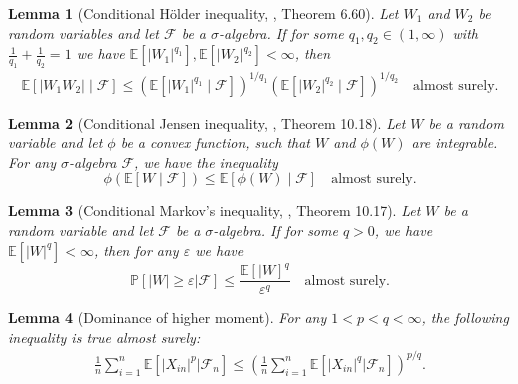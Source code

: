 \documentclass[12pt]{article}
\newtheorem{lemma}{Lemma}
\theoremstyle{definition}
\def\P{\mathbb{P}}
\def\P{\mathbb{P}}
\newcommand{\E}{\mathbb E}								%
\renewcommand{\P}{\mathbb{P}}							%
\begin{document}
\begin{lemma}[Conditional H\"older inequality, \cite{Swanson2019}, Theorem 6.60]\label{lem:cond_holder}
	Let $W_1$ and $W_2$ be random variables and let $\mathcal F$ be a $\sigma$-algebra. If for some $q_1, q_2 \in (1,\infty)$ with $\frac{1}{q_1} + \frac{1}{q_2} = 1$ we have $\E[|W_1|^{q_1}], \E[|W_2|^{q_2}] < \infty$, then
	\begin{align*}
		\E[|W_1 W_2| \mid \mathcal F] \leq (\E[|W_1|^{q_1} \mid \mathcal F])^{1/q_1}(\E[|W_2|^{q_2} \mid \mathcal F])^{1/q_2} \quad \text{almost surely}.
	\end{align*}
\end{lemma}

\begin{lemma}[Conditional Jensen inequality, \cite{Davidson2003}, Theorem 10.18] \label{lem:conditional-jensen}
	Let $W$ be a random variable and let $\phi$ be a convex function, such that $W$ and $\phi(W)$ are integrable. For any $\sigma$-algebra $\mathcal F$, we have the inequality
	\begin{equation*}
		\phi(\E[W \mid \mathcal F]) \leq  \E[\phi(W) \mid \mathcal F] \quad \text{almost surely}.
	\end{equation*}
\end{lemma}

\begin{lemma}[Conditional Markov's inequality, \cite{Davidson2003}, Theorem 10.17]\label{lem:conditional_Markov}
  Let $W$ be a random variable and let $\mathcal{F}$ be a $\sigma$-algebra. If for some $q>0$, we have $\E[|W|^q]<\infty$, then for any $\varepsilon$ we have
	\begin{equation*}
		\P[|W|\geq \varepsilon|\mathcal{F}]\leq \frac{\E[|W]^q}{\varepsilon^q}\quad\text{almost surely}.
	\end{equation*}
\end{lemma}

\begin{lemma}[Dominance of higher moment]\label{lem:moment_dominance}
  For any $1<p<q<\infty$, the following inequality is true almost surely:
  \begin{align*}
    \frac{1}{n}\sum_{i=1}^n \E[|X_{in}|^{p}|\mathcal{F}_n]\leq \left(\frac{1}{n}\sum_{i=1}^n \E[|X_{in}|^{q}|\mathcal{F}_n]\right)^{p/q}.
  \end{align*}
\end{lemma}
\end{document}
